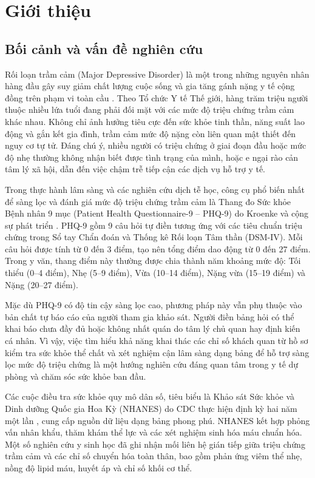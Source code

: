 \chapter{Giới thiệu}
\label{ch:gioi-thieu}

\section{Bối cảnh và vấn đề nghiên cứu}
\label{sec:boi-canh}

Rối loạn trầm cảm (Major Depressive Disorder) là một trong những nguyên nhân hàng đầu gây suy giảm chất lượng cuộc sống và gia tăng gánh nặng y tế cộng đồng trên phạm vi toàn cầu \cite{pratt2014depression}. Theo Tổ chức Y tế Thế giới, hàng trăm triệu người thuộc nhiều lứa tuổi đang phải đối mặt với các mức độ triệu chứng trầm cảm khác nhau. Không chỉ ảnh hưởng tiêu cực đến sức khỏe tinh thần, năng suất lao động và gắn kết gia đình, trầm cảm mức độ nặng còn liên quan mật thiết đến nguy cơ tự tử. Đáng chú ý, nhiều người có triệu chứng ở giai đoạn đầu hoặc mức độ nhẹ thường không nhận biết được tình trạng của mình, hoặc e ngại rào cản tâm lý xã hội, dẫn đến việc chậm trễ tiếp cận các dịch vụ hỗ trợ y tế.

Trong thực hành lâm sàng và các nghiên cứu dịch tễ học, công cụ phổ biến nhất để sàng lọc và đánh giá mức độ triệu chứng trầm cảm là Thang đo Sức khỏe Bệnh nhân 9 mục (Patient Health Questionnaire-9 -- PHQ-9) do Kroenke và cộng sự phát triển \cite{kroenke2001phq, spitzer1999validation}. PHQ-9 gồm 9 câu hỏi tự điền tương ứng với các tiêu chuẩn triệu chứng trong Sổ tay Chẩn đoán và Thống kê Rối loạn Tâm thần (DSM-IV). Mỗi câu hỏi được tính từ 0 đến 3 điểm, tạo nên tổng điểm dao động từ 0 đến 27 điểm. Trong y văn, thang điểm này thường được chia thành năm khoảng mức độ: Tối thiểu (0--4 điểm), Nhẹ (5--9 điểm), Vừa (10--14 điểm), Nặng vừa (15--19 điểm) và Nặng (20--27 điểm).

Mặc dù PHQ-9 có độ tin cậy sàng lọc cao, phương pháp này vẫn phụ thuộc vào bản chất tự báo cáo của người tham gia khảo sát. Người điền bảng hỏi có thể khai báo chưa đầy đủ hoặc không nhất quán do tâm lý chủ quan hay định kiến cá nhân. Vì vậy, việc tìm hiểu khả năng khai thác các chỉ số khách quan từ hồ sơ kiểm tra sức khỏe thể chất và xét nghiệm cận lâm sàng dạng bảng để hỗ trợ sàng lọc mức độ triệu chứng là một hướng nghiên cứu đáng quan tâm trong y tế dự phòng và chăm sóc sức khỏe ban đầu.

Các cuộc điều tra sức khỏe quy mô dân số, tiêu biểu là Khảo sát Sức khỏe và Dinh dưỡng Quốc gia Hoa Kỳ (NHANES) do CDC thực hiện định kỳ hai năm một lần \cite{cdc2014nhanes, cdc2016nhanes}, cung cấp nguồn dữ liệu dạng bảng phong phú. NHANES kết hợp phỏng vấn nhân khẩu, thăm khám thể lực và các xét nghiệm sinh hóa máu chuẩn hóa. Một số nghiên cứu y sinh học đã ghi nhận mối liên hệ gián tiếp giữa triệu chứng trầm cảm và các chỉ số chuyển hóa toàn thân, bao gồm phản ứng viêm thể nhẹ, nồng độ lipid máu, huyết áp và chỉ số khối cơ thể.

